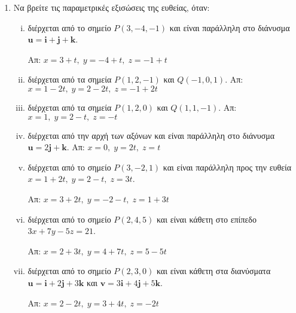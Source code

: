 \documentclass[a4paper,table]{report}
\begin{document}
\begin{center}
\minibox{\large\bfseries \textcolor{Col1}{Ασκήσεις στις ευθείες και τα επίπεδα}}
\end{center}

\vspace{\baselineskip}

\begin{enumerate}
  \item Να βρείτε τις παραμετρικές εξισώσεις της ευθείας, όταν:
    \begin{enumerate}[i)]
      \item διέρχεται από το σημείο $ P(3,-4,-1) $ και είναι παράλληλη στο διάνυσμα 
        $ \mathbf{u} = \mathbf{i}+ \mathbf{j}+ \mathbf{k} $. 

        \hfill Απ: $ x=3+t, \; y=-4+t, \; z=-1+t $

      \item διέρχεται από τα σημεία $ P(1,2,-1) $ και $ Q(-1,0,1) $.
        \hfill Απ: $ x=1-2t, \; y=2-2t, \; z=-1+2t $ 

      \item διέρχεται από τα σημεία $ P(1,2,0) $ και $ Q(1,1,-1) $.
        \hfill Απ: $ x=1, \; y=2-t, \; z=-t $ 

      \item διέρχεται από την αρχή των αξόνων και είναι παράλληλη στο διάνυσμα 
        $ \mathbf{u} = 2 \mathbf{j}+ \mathbf{k} $.
        \hfill Απ: $ x=0, \; y=2t, \; z=t $ 

      \item διέρχεται από το σημείο $ P(3,-2,1) $ και είναι παράλληλη προς την ευθεία 
        $ x=1+2t, \; y=2-t, \; z=3t $.

        \hfill Απ: $ x=3+2t, \; y=-2-t, \; z=1+3t $ 

      \item διέρχεται από το σημείο $ P(2,4,5) $ και είναι κάθετη στο επίπεδο 
        $ 3x+7y-5z=21 $.

        \hfill Απ: $ x=2+3t, \; y=4+7t, \; z=5-5t $ 

      \item διέρχεται από το σημείο $ P(2,3,0) $ και είναι κάθετη στα διανύσματα 
        $ \mathbf{u} = \mathbf{i}+2 \mathbf{j}+3 \mathbf{k} $ και $ \mathbf{v} = 3
        \mathbf{i}+ 4 \mathbf{j}+5 \mathbf{k} $.

        \hfill Απ: $ x=2-2t, \; y=3+4t, \; z=-2t $  
    \end{enumerate}


\end{enumerate}
\end{document}
